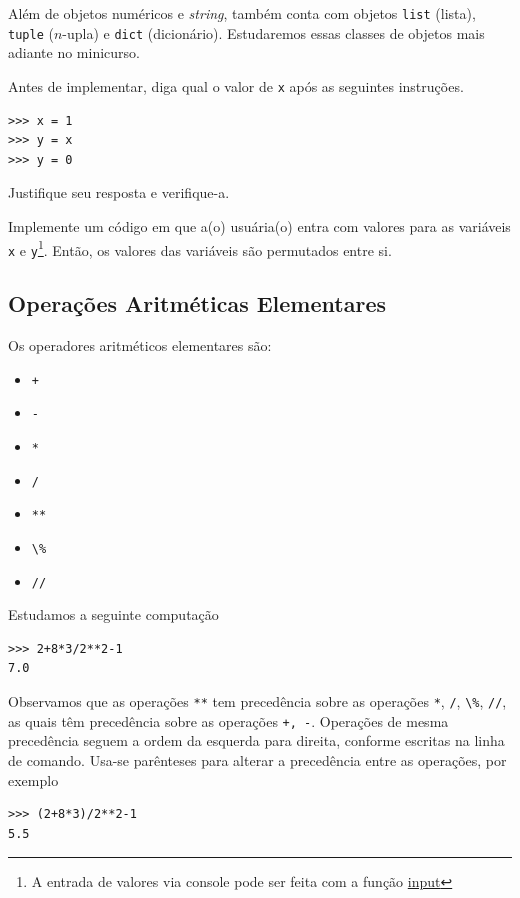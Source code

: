 \documentclass[12pt]{article}
\begin{document}
Além de objetos numéricos e {\it string}, {\python} também conta com objetos \lstinline+list+ (lista), \lstinline+tuple+ ($n$-upla) e \lstinline+dict+ (dicionário). Estudaremos essas classes de objetos mais adiante no minicurso.

\begin{exr}
  Antes de implementar, diga qual o valor de \lstinline+x+ após as seguintes instruções.

\begin{lstlisting}
>>> x = 1
>>> y = x
>>> y = 0
\end{lstlisting}

Justifique seu resposta e verifique-a.
\end{exr}

\begin{exr}
  Implemente um código em que a(o) usuária(o) entra com valores para as variáveis \lstinline+x+ e \lstinline+y+\footnote{A entrada de valores via console pode ser feita com a função \href{https://docs.python.org/3/library/functions.html\#input}{input}}. Então, os valores das variáveis são permutados entre si.
\end{exr}

\subsection{Operações Aritméticas Elementares}

Os operadores aritméticos elementares são:
\begin{itemize}
\item[] \lstinline-+- 
\item[] \lstinline+-+ 
\item[] \lstinline+*+ 
\item[] \lstinline+/+ 
\item[] \lstinline+**+ 
\item[] \lstinline+\%+ 
\item[] \lstinline+//+ 
\end{itemize}

\begin{ex}
  Estudamos a seguinte computação

\begin{lstlisting}
>>> 2+8*3/2**2-1
7.0
\end{lstlisting}

Observamos que as operações \lstinline+**+ tem precedência sobre as operações \lstinline+*+, \lstinline+/+, \lstinline+\%+, \lstinline+//+, as quais têm precedência sobre as operações \lstinline!+, -!. Operações de mesma precedência seguem a ordem da esquerda para direita, conforme escritas na linha de comando. Usa-se parênteses para alterar a precedência entre as operações, por exemplo

\begin{lstlisting}
>>> (2+8*3)/2**2-1
5.5
\end{lstlisting}

\end{ex}
\end{document}

